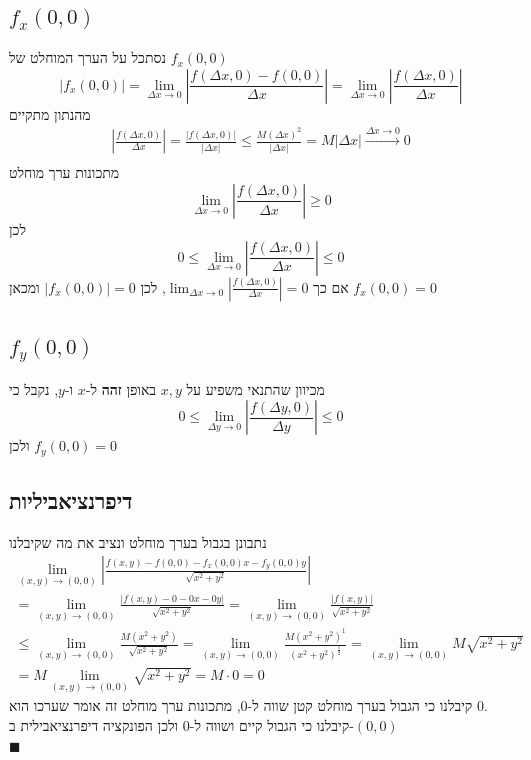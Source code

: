 \documentclass[12pt, titlepage]{article}
\begin{document}
\subsection*{$f_x\left(0,0\right)$}
נסתכל על הערך המוחלט של $f_x\left(0,0\right)$
\[
\left|f_x\left(0,0\right)\right|=     \lim_{\Delta x \to 0} \left|\frac{f\left(\Delta x,0\right) - f\left(0,0\right)}{\Delta x}\right| =\lim_{\Delta x \to 0}\left| \frac{f\left(\Delta x,0\right)}{\Delta x}\right|
\]
מהנתון מתקיים
\begin{gather*}
    \left|\frac{f\left(\Delta x,0\right)}{\Delta x}\right|=\frac{\left|f\left(\Delta x,0\right)\right|}{\left|\Delta x\right|} \leq \frac{M\left(\Delta x\right)^2}{\left|\Delta x\right|} = M\left|\Delta x\right|\xrightarrow{\Delta x \to 0} 0\\
\end{gather*}
מתכונות ערך מוחלט
\[
  \lim_{\Delta x\to 0}    \left|\frac{f\left(\Delta x,0\right)}{\Delta x}\right| \geq 0
\]
לכן
\[
    0 \leq \lim_{\Delta x \to 0} \left|\frac{f\left(\Delta x,0\right)}{\Delta x}\right| \leq 0
\]
אם כך $\lim_{\Delta x \to 0}\left|\frac{f\left(\Delta x,0\right)}{\Delta x}\right| = 0$, לכן $\left|f_x\left(0,0\right)\right|=0$ ומכאן $\boxed{f_x\left(0,0\right)=0}$
\subsection*{$f_y\left(0,0\right)$}
מכיוון שהתנאי משפיע על $x,y$ באופן \textbf{זהה} ל-$x$ ו-$y$, נקבל כי 
\[
    0 \leq \lim_{\Delta y \to 0} \left|\frac{f\left(\Delta y,0\right)}{\Delta y}\right| \leq 0
\]
ולכן $\boxed{f_y\left(0,0\right)=0}$
\subsection*{דיפרנציאביליות}
נתבונן בגבול בערך מוחלט ונציב את מה שקיבלנו
\begin{gather*}
    \lim_{\left(x,y\right)\to\left(0,0\right)} \left|\frac{f\left(x,y\right)-f\left(0,0\right)-f_x\left(0,0\right)x-f_y\left(0,0\right)y}{\sqrt{x^2+y^2}}\right| \\
    = \lim_{\left(x,y\right)\to\left(0,0\right)} \frac{\left|f\left(x,y\right)-0-0x -0y\right|}{\sqrt{x^2+y^2}} = \lim_{\left(x,y\right)\to\left(0,0\right)} \frac{\left|f\left(x,y\right)\right|}{\sqrt{x^2+y^2}} \\\leq \lim_{\left(x,y\right)\to\left(0,0\right)} \frac{M\left(x^2+y^2\right)}{\sqrt{x^2+y^2}} =\lim_{\left(x,y\right)\to\left(0,0\right)} \frac{M\left(x^2+y^2\right)^1}{\left(x^2+y^2\right)^{\frac{1}{2}}} = \lim_{\left(x,y\right)\to\left(0,0\right)} M\sqrt{x^2+y^2}\\
    = M\lim_{\left(x,y\right)\to\left(0,0\right)} \sqrt{x^2+y^2} = M \cdot 0 = 0
\end{gather*}
קיבלנו כי הגבול בערך מוחלט קטן שווה ל-$0$, מתכונות ערך מוחלט זה אומר שערכו הוא $0$.\\
קיבלנו כי הגבול קיים ושווה ל-$0$ ולכן הפונקציה דיפרנציאבילית ב-$\left(0,0\right)$\\
$\blacksquare$
\newpage
\end{document}
